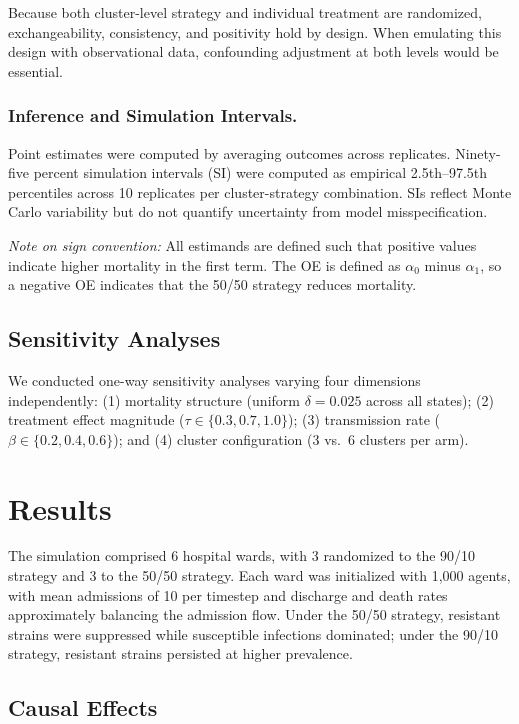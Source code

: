 \documentclass[12pt]{article}
\begin{document}
Because both cluster-level strategy and individual treatment are randomized, exchangeability, consistency, and positivity hold by design. When emulating this design with observational data, confounding adjustment at both levels would be essential.\cite{tchetgen_tchetgen_causal_2012}

\subsubsection*{Inference and Simulation Intervals.}
Point estimates were computed by averaging outcomes across replicates. Ninety-five percent simulation intervals (SI) were computed as empirical 2.5th--97.5th percentiles across 10 replicates per cluster-strategy combination. SIs reflect Monte Carlo variability but do not quantify uncertainty from model misspecification.

\textit{Note on sign convention:} All estimands are defined such that positive values indicate higher mortality in the first term. The OE is defined as $\alpha_0$ minus $\alpha_1$, so a negative OE indicates that the 50/50 strategy reduces mortality.

\subsection*{Sensitivity Analyses}

We conducted one-way sensitivity analyses varying four dimensions independently: (1) mortality structure (uniform $\delta = 0.025$ across all states); (2) treatment effect magnitude ($\tau \in \{0.3, 0.7, 1.0\}$); (3) transmission rate ($\beta \in \{0.2, 0.4, 0.6\}$); and (4) cluster configuration (3 vs.\ 6 clusters per arm).

\section*{Results}

The simulation comprised 6 hospital wards, with 3 randomized to the 90/10 strategy and 3 to the 50/50 strategy. Each ward was initialized with 1,000 agents, with mean admissions of 10 per timestep and discharge and death rates approximately balancing the admission flow. Under the 50/50 strategy, resistant strains were suppressed while susceptible infections dominated; under the 90/10 strategy, resistant strains persisted at higher prevalence.

\subsection*{Causal Effects}
\end{document}
